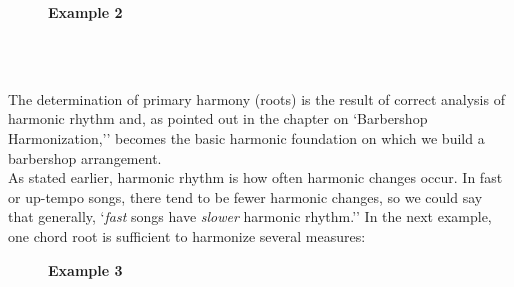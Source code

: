 \documentclass{article} %
\numberwithin{equation}{section} %
\begin{document}
		\begin{figure}[H]
		\textbf{Example 2}
		
		\\

		\\
		\end{figure}

		The determination of primary harmony (roots) is the result of correct analysis of harmonic rhythm and, as pointed out in the chapter on `Barbershop Harmonization,'' becomes the basic harmonic foundation on which we build a barbershop arrangement. \\

		As stated earlier, harmonic rhythm is how often harmonic changes occur. In fast or up-tempo songs, there tend to be fewer harmonic changes, so we could say that generally, `\textit{fast} songs have \textit{slower} harmonic rhythm.'' In the next example, one chord root is sufficient to harmonize several measures: \\

		\begin{figure}[H]
		\textbf{Example 3}
		
		\\

		\\
		\end{figure}
\end{document}
